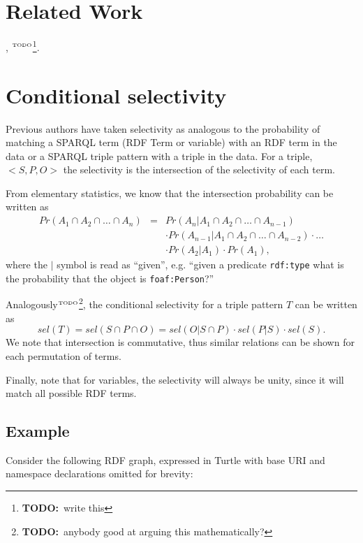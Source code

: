 \documentclass[12pt, draft]{article}
\newcommand{\rdfterm}[1]{\texttt{#1}}
\newcommand{\todo}[1]{\ensuremath{^{\textrm{\tiny{TODO}\normalsize}}}\footnote{\textbf{TODO:}~#1}}
\newcommand{\sel}[1]{\ensuremath{sel\left(#1\right)}}
\begin{document}
\section{Related Work}

\cite{splendid}, \cite{wodqa} \todo{write this}.

\section{Conditional selectivity}\label{sec:cond}

Previous authors have taken selectivity as analogous to the
probability of matching a SPARQL term (RDF Term or variable) with an
RDF term in the data or a SPARQL triple pattern with a triple in the
data.  For a triple, $<S, P, O>$ the selectivity is the intersection
of the selectivity of each term.

From elementary statistics, we know that the intersection probability
can be written as
\begin{eqnarray}
Pr(A_1 \cap A_2  \cap \ldots \cap A_n) &=& 
  Pr(A_n | A_1 \cap A_2  \cap \ldots \cap A_{n-1}) \nonumber\\
  &&\cdot Pr(A_{n-1} | A_1 \cap A_2  \cap \ldots \cap A_{n-2}) \cdot \ldots \nonumber\\
  && \cdot Pr(A_2 | A_1) \cdot Pr(A_1) ,
\end{eqnarray}
where the $|$ symbol is read as ``given'', e.g. ``given a predicate
\rdfterm{rdf:type} what is the probability that the object is \rdfterm{foaf:Person}?''

Analogously\todo{anybody good at arguing this mathematically?}, the
conditional selectivity for a triple pattern $T$ can be written as 
\begin{equation}\label{eq:sel}
\sel{T} = \sel{S \cap P \cap O} = \sel{O | S \cap P} \cdot \sel{P | S}
\cdot \sel{S} . 
\end{equation}
We note that intersection is commutative, thus similar
relations can be shown for each permutation of terms.

Finally, note that for variables, the selectivity will always be
unity, since it will match all possible RDF terms.

\subsection{Example}\label{sec:example}

Consider the following RDF graph, expressed in Turtle with base URI
and namespace declarations omitted for brevity:
\end{document}
